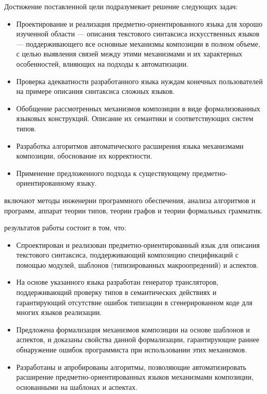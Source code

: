  Достижение поставленной цели подразумевает решение следующих задач:
\begin{itemize}
\item Проектирование и реализация предметно-ориентированного языка для хорошо изученной области --- описания текстового синтаксиса искусственных языков --- поддерживающего все основные механизмы композиции в полном объеме, с целью выявления связей между этими механизмами и их характерных особенностей, влияющих на подходы к автоматизации.
\item Проверка адекватности разработанного языка нуждам конечных пользователей на примере описания синтаксиса сложных языков.
\item Обобщение рассмотренных механизмов композиции в виде формализованных языковых конструкций. Описание их семантики и соответствующих систем типов.
\item Разработка алгоритмов автоматического расширения языка механизмами композиции, обоснование их корректности.
\item Применение предложенного подхода к существующему предметно-ориентированному языку.
\end{itemize}

 включают методы инженерии программного обеспечения, анализа алгоритмов и программ, аппарат теории типов, теории графов и теории формальных грамматик.

 результатов работы состоит в том, что:
\begin{itemize}
\item Спроектирован и реализован предметно-ориентированный язык для описания текстового синтаксиса, поддерживающий композицию спецификаций с помощью модулей, шаблонов (типизированных макроопредений) и аспектов.
\item На основе указанного языка разработан генератор трансляторов, поддерживающий проверку типов в семантических действиях и гарантирующий отсутствие ошибок типизации в сгенерированном коде для многих языков реализации.
\item Предложена формализация механизмов композиции на основе шаблонов и аспектов, и доказаны свойства данной формализации, гарантирующие раннее обнаружение ошибок программиста при использовании этих механизмов.
\item Разработаны и апробированы алгоритмы, позволяющие автоматизировать расширение предметно-ориентированных языков механизмами композиции, основанными на шаблонах и аспектах.
\end{itemize}

